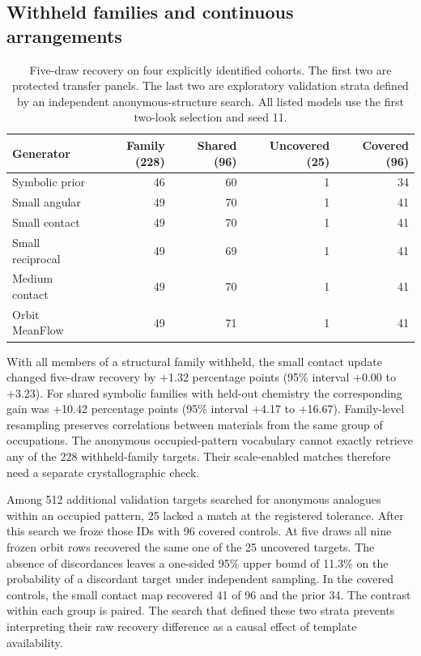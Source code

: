\subsection{Withheld families and continuous arrangements}

\begin{table}[!htbp]\centering\small\setlength{\tabcolsep}{3.6pt}
\caption{Five-draw recovery on four explicitly identified cohorts. The first two are protected transfer panels. The last two are exploratory validation strata defined by an independent anonymous-structure search. All listed models use the first two-look selection and seed 11.}\label{tab:transfer}
\begin{tabular}{lrrrr}\hline
Generator & Family (228) & Shared (96) & Uncovered (25) & Covered (96)\\\hline
Symbolic prior & 46 & 60 & 1 & 34\\
Small angular & 49 & 70 & 1 & 41\\
Small contact & 49 & 70 & 1 & 41\\
Small reciprocal & 49 & 69 & 1 & 41\\
Medium contact & 49 & 70 & 1 & 41\\
Orbit MeanFlow & 49 & 71 & 1 & 41\\
\hline\end{tabular}\end{table}

With all members of a structural family withheld, the small contact update changed five-draw recovery by +1.32 percentage points (95\% interval +0.00 to +3.23). For shared symbolic families with held-out chemistry the corresponding gain was +10.42 percentage points (95\% interval +4.17 to +16.67). Family-level resampling preserves correlations between materials from the same group of occupations. The anonymous occupied-pattern vocabulary cannot exactly retrieve any of the 228 withheld-family targets. Their scale-enabled matches therefore need a separate crystallographic check.

Among 512 additional validation targets searched for anonymous analogues within an occupied pattern, 25 lacked a match at the registered tolerance. After this search we froze those IDs with 96 covered controls. At five draws all nine frozen orbit rows recovered the same one of the 25 uncovered targets. The absence of discordances leaves a one-sided 95\% upper bound of 11.3\% on the probability of a discordant target under independent sampling. In the covered controls, the small contact map recovered 41 of 96 and the prior 34. The contrast within each group is paired. The search that defined these two strata prevents interpreting their raw recovery difference as a causal effect of template availability.

